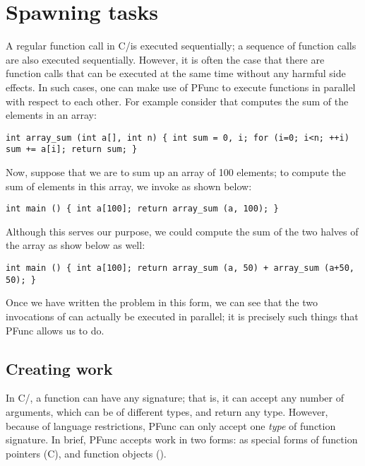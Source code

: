 \section{Spawning tasks}
\label{sec:spawn}
%
A regular function call in C/\Cpp{}is executed sequentially; a sequence of
function calls are also executed sequentially.
%
However, it is often the case that there are function calls that can be
executed at the same time without any harmful side effects.  
%
In such cases, one can make use of PFunc to execute functions in parallel with
respect to each other.  
%
For example consider  that computes the sum of the elements 
in an array:
%
\begin{lstlisting}
int array_sum (int a[], int n) { int sum = 0, i; for (i=0; i<n; ++i)  sum += a[i]; return sum; } 
\end{lstlisting}
%
Now, suppose that we are to sum up an array of 100 elements; to compute the
sum of elements in this array, we invoke  as shown below:
%
\begin{lstlisting}
int main () { int a[100]; return array_sum (a, 100); }
\end{lstlisting}
%
Although this serves our purpose, we could compute the sum of the two halves 
of the array as show below as well: 
%
\begin{lstlisting}
int main () { int a[100]; return array_sum (a, 50) + array_sum (a+50, 50); }
\end{lstlisting}
%
Once we have written the problem in this form, we can see that the two
invocations of  can actually be executed in parallel; it is
precisely such things that PFunc allows us to do.

\subsection{Creating work}
%
In C/\Cpp{}, a function can have any signature; that is, it can accept any
number of arguments, which can be of different types, and return any type.
%
However, because of language restrictions, PFunc can only accept one
\textit{type} of function signature.
%
In brief, PFunc accepts work in two forms: as special forms of function
pointers (C), and  function objects (\Cpp{}).  

